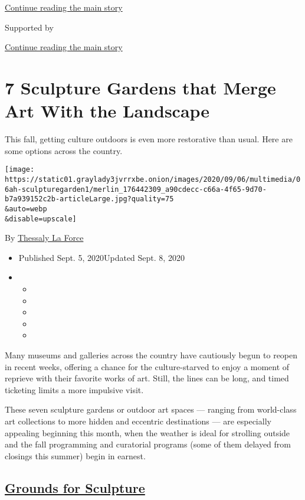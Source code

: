 \protect\hyperlink{after-top}{Continue reading the main story}

Supported by

\protect\hyperlink{after-sponsor}{Continue reading the main story}

\hypertarget{7-sculpture-gardens-that-merge-art-with-the-landscape}{%
\section{7 Sculpture Gardens that Merge Art With the
Landscape}\label{7-sculpture-gardens-that-merge-art-with-the-landscape}}

This fall, getting culture outdoors is even more restorative than usual.
Here are some options across the country.

\texttt{[image: https://static01.graylady3jvrrxbe.onion/images/2020/09/06/multimedia/06ah-sculpturegarden1/merlin\_176442309\_a90cdecc-c66a-4f65-9d70-b7a939152c2b-articleLarge.jpg?quality=75\\\&auto=webp\\\&disable=upscale]}

By
\href{https://www.nytimes3xbfgragh.onion/by/thessaly-la-force}{Thessaly
La Force}

\begin{itemize}
\item
  Published Sept. 5, 2020Updated Sept. 8, 2020
\item
  \begin{itemize}
  \item
  \item
  \item
  \item
  \item
  \end{itemize}
\end{itemize}

Many museums and galleries across the country have cautiously begun to
reopen in recent weeks, offering a chance for the culture-starved to
enjoy a moment of reprieve with their favorite works of art. Still, the
lines can be long, and timed ticketing limits a more impulsive visit.

These seven sculpture gardens or outdoor art spaces --- ranging from
world-class art collections to more hidden and eccentric destinations
--- are especially appealing beginning this month, when the weather is
ideal for strolling outside and the fall programming and curatorial
programs (some of them delayed from closings this summer) begin in
earnest.

\hypertarget{grounds-for-sculpture}{%
\subsection{\texorpdfstring{\href{https://www.groundsforsculpture.org/}{Grounds
for Sculpture}}{Grounds for Sculpture}}\label{grounds-for-sculpture}}

